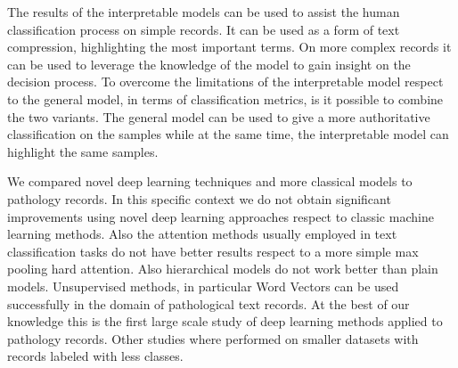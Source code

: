The results of the interpretable models can be used to
assist the human classification process on simple records. It can be
used as
a form of text compression, highlighting the most important terms. On
more complex records it can be used to leverage the knowledge of the
model to gain insight on the decision process. To overcome the
limitations of the interpretable
model respect to the general model, in terms of
classification metrics, is it possible to combine the two variants. The
general model can be used to give a more
authoritative classification on the samples while at the same time,
the interpretable model can highlight the same samples.

We compared novel deep learning techniques and more classical models
to pathology records. In this specific context we do not obtain
significant improvements using novel deep learning approaches respect
to classic machine learning methods. Also the attention methods
usually employed in text classification tasks do not have better
results respect to a more simple max pooling hard attention. Also
hierarchical models do not work better than plain models. Unsupervised
methods, in particular Word Vectors
can be used successfully in the
domain of pathological text records. At the best of our knowledge this
is the first large scale study of deep learning methods applied to
pathology records. Other studies where performed on smaller datasets
with records labeled with less classes.

